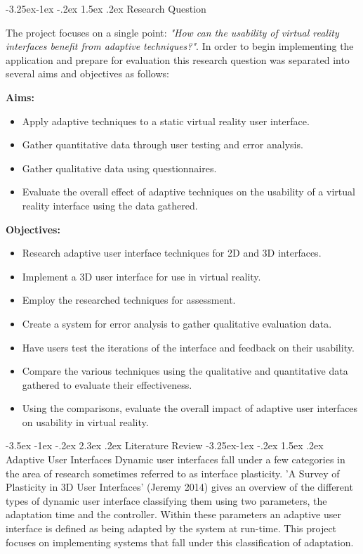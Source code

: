 \documentclass[12pt]{article}
\makeatletter
\renewcommand{\section}{\@startsection {section}{1}{\z@}%
             {-3.5ex \@plus -1ex \@minus -.2ex}%
             {2.3ex \@plus .2ex}%
             {\normalfont\Large\scshape\bfseries}}
\renewcommand{\subsection}{\@startsection{subsection}{2}{\z@}%
             {-3.25ex\@plus -1ex \@minus -.2ex}%
             {1.5ex \@plus .2ex}%
             {\normalfont\large\scshape\bfseries}}
\makeatother
\begin{document}
\subsection{Research Question} 

The project focuses on a single point: \emph{"How can the usability of virtual reality interfaces benefit from adaptive techniques?"}. In order to begin implementing the application and prepare for evaluation this research question was separated into several aims and objectives as follows:

\textbf{Aims:}
\begin{itemize}[noitemsep,topsep=0pt]
\item Apply adaptive techniques to a static virtual reality user interface.
\item Gather quantitative data through user testing and error analysis.
\item Gather qualitative data using questionnaires.
\item Evaluate the overall effect of adaptive techniques on the usability of a virtual reality interface using the data gathered.
\end{itemize}

\textbf{Objectives:}
\begin{itemize}[noitemsep,topsep=0pt]
\item Research adaptive user interface techniques for 2D and 3D interfaces.
\item Implement a 3D user interface for use in virtual reality.
\item Employ the researched techniques for assessment.
\item Create a system for error analysis to gather qualitative evaluation data.
\item Have users test the iterations of the interface and feedback on their usability.
\item Compare the various techniques using the qualitative and quantitative data gathered to evaluate their effectiveness.
\item Using the comparisons, evaluate the overall impact of adaptive user interfaces on usability in virtual reality.
\end{itemize}

\section{Literature Review}
\subsection{Adaptive User Interfaces}
Dynamic user interfaces fall under a few categories in the area of research sometimes referred to as interface plasticity. 'A Survey of Plasticity in 3D User Interfaces' (Jeremy 2014) gives an overview of the different types of dynamic user interface classifying them using two parameters, the adaptation time and the controller. Within these parameters an adaptive user interface is defined as being adapted by the system at run-time. This project focuses on implementing systems that fall under this classification of adaptation.
\end{document}
